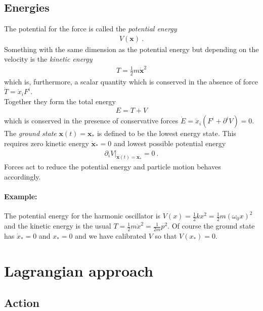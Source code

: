 \documentclass[12pt]{article}
\begin{document}
\subsection{Energies}
The potential for the force is called the {\em potential energy}
\begin{eqnarray}
V(\mathbf x)~.
\end{eqnarray}
Something with the same dimension as the potential energy but depending on the velocity is the {\em kinetic energy}
\begin{eqnarray}
T=\frac 12 m \dot {\mathbf x}^2
\end{eqnarray}
which is, furthermore, a scalar quantity which is conserved in the absence of force $\dot T=\dot x_i F^i$.\\
Together they form the total energy 
\begin{eqnarray}
E=T+V
\end{eqnarray}
which is conserved in the presence of conservative forces $\dot E=\dot x_i (F^i+\partial^i V)=0$.\\
The {\em ground state} $\mathbf x(t)=\mathbf x_*$ is defined to be the lowest energy state. This requires zero kinetic energy $\dot{\mathbf x}_*=0$ and lowest possible potential energy
\begin{eqnarray}
\partial_i V|_{\mathbf x(t)=\mathbf x_*}=0~.
\end{eqnarray}
Forces act to reduce the potential energy and particle motion behaves accordingly.

\paragraph{Example:} The potential energy for the harmonic oscillator is $V(x)=\frac 12 k x^2=\frac 12 m (\omega_0 x)^2$ and the kinetic energy is the usual $T=\frac12 m\dot x^2=\frac 1{2m}p^2$. Of course the ground state has $\dot x_*=0$ and $x_*=0$ and we have calibrated $V$ so that $V(x_*)=0$.

\section{Lagrangian approach}

\subsection{Action}
\end{document}
